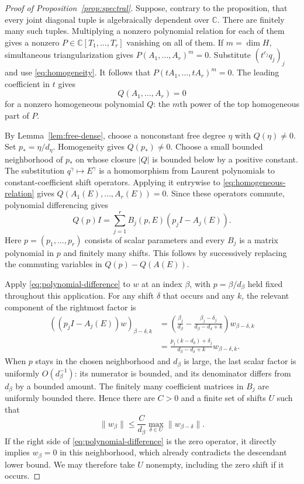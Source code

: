 \begin{proof}[Proof of Proposition~\ref{prop:spectral}]
Suppose, contrary to the proposition, that every joint diagonal tuple
is algebraically dependent over $\mathbb C$. There are finitely many
such tuples. Multiplying a nonzero polynomial relation for each of them
gives a nonzero $P\in\mathbb C[T_1,\ldots,T_r]$ vanishing on all of them.
If $m=\dim H$, simultaneous triangularization gives
$P(A_1,\ldots,A_r)^m=0$.
Substitute $(t^{c_j}q_j)_j$ and use \eqref{eq:homogeneity}. It follows
that $P(tA_1,\ldots,tA_r)^m=0$. The leading coefficient in $t$ gives
\begin{equation}\label{eq:homogeneous-relation}
 Q(A_1,\ldots,A_r)=0
\end{equation}
for a nonzero homogeneous polynomial $Q$: the $m$th power of the top
homogeneous part of $P$.

By Lemma~\ref{lem:free-dense}, choose a nonconstant free degree $\eta$
with $Q(\eta)\ne0$. Set $p_* =\eta/d_\eta$. Homogeneity gives
$Q(p_*)\ne0$. Choose a small bounded neighborhood of $p_*$ on whose
closure $|Q|$ is bounded below by a positive constant.
The substitution $q^\gamma\mapsto E^\gamma$ is a homomorphism from
Laurent polynomials to constant-coefficient shift operators. Applying it
entrywise to \eqref{eq:homogeneous-relation} gives
$Q(A_1(E),\ldots,A_r(E))=0$. Since these operators commute,
polynomial differencing gives
\begin{equation}\label{eq:polynomial-difference}
 Q(p)I=\sum_{j=1}^rB_j(p,E)(p_jI-A_j(E)).
\end{equation}
Here $p=(p_1,\ldots,p_r)$ consists of scalar parameters and every $B_j$
is a matrix polynomial in $p$ and finitely many shifts. This follows by
successively replacing the commuting variables in $Q(p)-Q(A(E))$.

Apply \eqref{eq:polynomial-difference} to $w$ at an index $\beta$,
with $p=\beta/d_\beta$ held fixed throughout this application.
For any shift $\delta$ that occurs and any $k$, the relevant component
of the rightmost factor is
\[
 \begin{aligned}
 ((p_jI-A_j(E))w)_{\beta-\delta,k}
 &=\left(\frac{\beta_j}{d_\beta}
    -\frac{\beta_j-\delta_j}{d_\beta-d_\delta+k}\right)
       w_{\beta-\delta,k}\\
 &=\frac{p_j(k-d_\delta)+\delta_j}{d_\beta-d_\delta+k}
       w_{\beta-\delta,k}.
 \end{aligned}
\]
When $p$ stays in the chosen neighborhood and $d_\beta$ is large,
the last scalar factor is uniformly $O(d_\beta^{-1})$: its numerator
is bounded, and its denominator differs from $d_\beta$ by a bounded amount.
The finitely many coefficient matrices in $B_j$ are uniformly bounded
there. Hence there are $C>0$ and a finite set of shifts $U$ such that
\begin{equation}\label{eq:small-shift-bound}
 \|w_\beta\|\le\frac C{d_\beta}
                     \max_{\delta\in U}\|w_{\beta-\delta}\|.
\end{equation}
If the right side of \eqref{eq:polynomial-difference} is the zero
operator, it directly implies $w_\beta=0$ in this neighborhood, which
already contradicts the descendant lower bound. We may therefore take
$U$ nonempty, including the zero shift if it occurs.


\end{proof}
